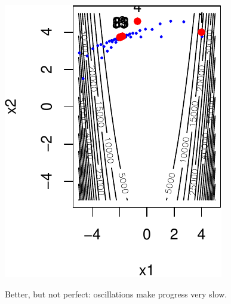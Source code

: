 \documentclass[12pt]{beamer}
\begin{document}
\begin{frame}
\begin{center}
\begin{minipage}[b]{0.3\textwidth}
\includegraphics[width=\textwidth]{gradient_rosen_LS_x-crop.pdf} 
\end{minipage}
\end{center}
Better, but not perfect: oscillations make progress very slow.
\end{frame}
\end{document}
